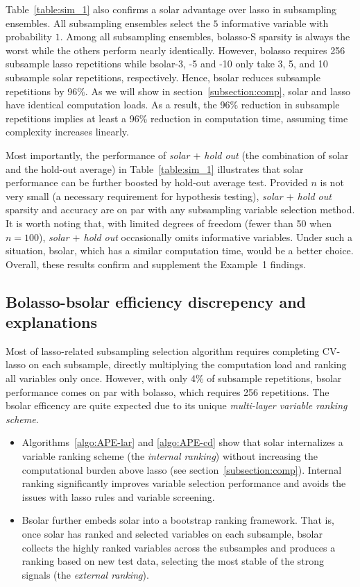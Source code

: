 \documentclass[11pt,review,authoryear]{elsarticle}
\begin{document}
Table~\ref{table:sim_1} also confirms a solar advantage over lasso in subsampling ensembles. All subsampling ensembles select the $5$ informative variable with probability $1$. Among all subsampling ensembles, bolasso-S sparsity is always the worst while the others perform nearly identically. However, bolasso requires 256 subsample lasso repetitions while bsolar-3, -5 and -10 only take 3, 5, and 10 subsample solar repetitions, respectively. Hence, bsolar reduces  subsample repetitions by 96\%. As we will show in section~\ref{subsection:comp}, solar and lasso have identical computation loads. As a result, the 96\% reduction in subsample repetitions implies at least a 96\% reduction in computation time, assuming time complexity increases linearly.

Most importantly, the performance of \emph{solar $+$ hold out} (the combination of solar and the hold-out average) in Table~\ref{table:sim_1} illustrates that solar performance can be further boosted by hold-out average test. Provided $n$ is not very small (a necessary requirement for hypothesis testing), \emph{solar $+$ hold out} sparsity and accuracy are on par with any subsampling variable selection method. It is worth noting that, with limited degrees of freedom (fewer than 50 when $n=100$), \emph{solar $+$ hold out} occasionally omits informative variables. Under such a situation, bsolar, which has a similar computation time, would be a better choice. Overall, these results confirm and supplement the Example~1 findings.

\subsection{Bolasso-bsolar efficiency discrepency and explanations}

Most of lasso-related subsampling selection algorithm requires completing CV-lasso on each subsample, directly multiplying the computation load and ranking all variables only once. However, with only 4\% of subsample repetitions, bsolar performance comes on par with bolasso, which requires 256 repetitions. The bsolar efficency are quite expected due to its unique \emph{multi-layer variable ranking scheme}.

\begin{itemize}
  \item Algorithms~\ref{algo:APE-lar} and \ref{algo:APE-cd} show that solar internalizes a variable ranking scheme (the \emph{internal ranking}) without increasing the computational burden above lasso (see section~\ref{subsection:comp}). Internal ranking significantly improves variable selection performance and avoids the issues with lasso rules and variable screening.

  \item Bsolar further embeds solar into a bootstrap ranking framework. That is, once solar has ranked and selected variables on each subsample, bsolar collects the highly ranked variables across the subsamples and produces a ranking based on new test data, selecting the most stable of the strong signals (the \emph{external ranking}).
\end{itemize}
\end{document}
